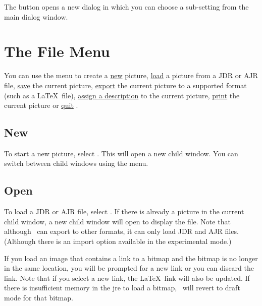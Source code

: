 
The  button opens a new dialog in which you
can choose a sub-setting from the main dialog window.

\chapter{The File Menu}\label{sec:filemenu}


You can use the  menu to create a
\hyperref[sec:newimage]{new} picture,
\hyperref[sec:loadimage]{load} a picture from a
\gls{JDR} or \gls{AJR} file,
\hyperref[sec:saveimage]{save} the current picture,
\hyperref[sec:exportimage]{export} the current
picture to a supported format (such as a \LaTeX\ file),
\hyperref[sec:imagedescription]{assign a description} to the
current picture, \hyperref[sec:print]{print} the
current picture or \hyperref[sec:quit]{quit} \FlowframTk.

\section{New}\label{sec:newimage}


To start a new picture, select . This will open
a new child window. You can switch between child windows using the
 menu.

\section{Open}\label{sec:loadimage}


To load a \gls{JDR} or \gls{AJR} file, select .
If there is already a picture in the current child window, a new
child window will open to display the file. Note that although
\FlowframTk\ can export to other formats, it can only load
\gls{JDR} and \gls{AJR} files. (Although there is an import option
available in the experimental mode.)

If you load an image that contains a link to a \gls{bitmap} and
the bitmap is no longer in the same location, you will be prompted
for a new link or you can discard the link. Note that if you
select a new link, the \LaTeX\ link will also be updated.
If there is insufficient memory in the \gls{jre} to load a bitmap,
\FlowframTk\ will revert to draft mode for that bitmap.

